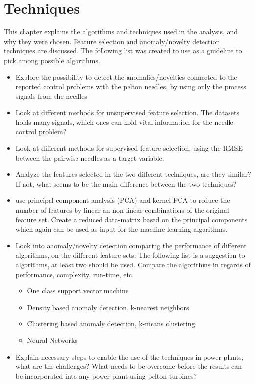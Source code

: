 \chapter{Techniques}\label{chap:techniques}

This chapter explains the algorithms and techniques used in the analysis, and why they were chosen. Feature selection and anomaly/novelty detection techniques are discussed. The following list was created to use as a guideline to pick among possible algorithms.

\begin{itemize}
    \item Explore the possibility to detect the anomalies/novelties connected to the reported control problems with the pelton needles, by using only the process signals from the needles  
    \item Look at different methods for unsupervised feature selection. The datasets holds many signals, which ones can hold vital information for the needle control problem? 
    \item Look at different methods for supervised feature selection, using the RMSE between the pairwise needles as a target variable. 
    \item Analyze the features selected in the two different techniques, are they similar? If not, what seems to be the main difference between the two techniques? 
    \item use principal component analysis (PCA) and kernel PCA to reduce the number of features by linear an non linear combinations of the original feature set. Create a reduced data-matrix based on the principal components which again can be used as input for the machine learning algorithms. 
    \item Look into anomaly/novelty detection comparing the performance of different algorithms, on the different feature sets. The following list is a suggestion to algorithms, at least two should be used. Compare the algorithms in regards of performance, complexity, run-time, etc. 
    \begin{itemize}
        \item One class support vector machine
        \item Density based anomaly detection, k-nearest neighbors
        \item Clustering based anomaly detection, k-means clustering 
        \item Neural Networks 
    \end{itemize}
    \item Explain necessary steps to enable the use of the techniques in power plants, what are the challenges? What needs to be overcome before the results can be incorporated into any power plant using pelton turbines?     
    
\end{itemize}


